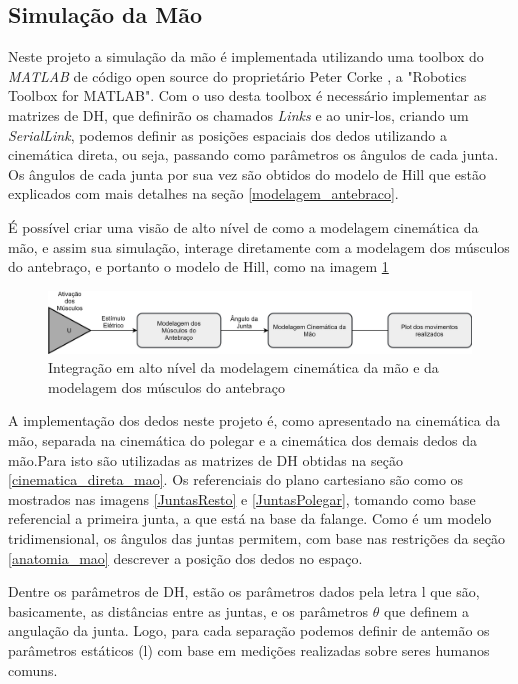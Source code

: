 \subsection{Simulação da Mão}
Neste projeto a simulação da mão é implementada utilizando uma toolbox do \textit{MATLAB} de código open source do proprietário Peter Corke \cite{corke1996robotics}, a "Robotics Toolbox for MATLAB". Com o uso desta toolbox é necessário implementar as matrizes de DH, que definirão os chamados \textit{Links} e ao unir-los, criando um \textit{SerialLink}, podemos definir as posições espaciais dos dedos utilizando a cinemática direta, ou seja, passando como parâmetros os ângulos de cada junta. Os ângulos de cada junta por sua vez são obtidos do modelo de Hill \cite{hill1938heat} que estão explicados com mais detalhes na seção \ref{modelagem_antebraco}. 

É possível criar uma visão de alto nível de como a modelagem cinemática da mão, e assim sua simulação, interage diretamente com a modelagem dos músculos do antebraço, e portanto o modelo de Hill, como na imagem \ref{IntegracaoAltoNivel}

\begin{figure}[H]
\centering
\includegraphics[width = 1\textwidth]{img/integracao_alto_nivel.JPG}
\caption[Integração em alto nível]{Integração em alto nível da modelagem cinemática da mão e da modelagem dos músculos do antebraço}
\label{IntegracaoAltoNivel}
\end{figure}

A implementação dos dedos neste projeto é, como apresentado na cinemática da mão, separada na cinemática do polegar e a cinemática dos demais dedos da mão.Para isto são utilizadas as matrizes de DH obtidas na seção \ref{cinematica_direta_mao}. Os referenciais do plano cartesiano são como os mostrados nas imagens \ref{JuntasResto} e \ref{JuntasPolegar}, tomando como base referencial a primeira junta, a que está na base da falange. Como é um modelo tridimensional, os ângulos das juntas permitem, com base nas restrições da seção \ref{anatomia_mao} descrever a posição dos dedos no espaço.

Dentre os parâmetros de DH, estão os parâmetros dados pela letra l que são, basicamente, as distâncias entre as juntas, e os parâmetros $\theta$ que definem a angulação da junta. Logo, para cada separação podemos definir de antemão os parâmetros estáticos (l) com base em medições realizadas sobre seres humanos comuns.

